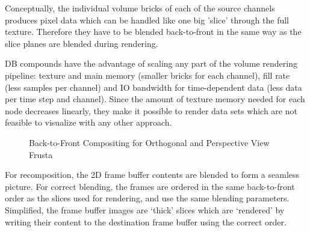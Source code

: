 \documentclass[10pt,a4]{scrartcl}
\begin{document}
Conceptually, the individual volume bricks of each of the source
channels produces pixel data which can be handled like one big 'slice'
through the full texture. Therefore they have to be blen\-ded
back-to-front in the same way as the slice planes are blended during
rendering.

DB compounds have the advantage of scaling any part of the volume
rendering pipeline: texture and main memory (smaller bricks for each
channel), fill rate (less samples per channel) and IO bandwidth for
time-dependent data (less data per time step and channel). Since the
amount of texture memory needed for each node decreases linearly, they
make it possible to render data sets which are not feasible to
visualize with any other approach.

\begin{figure}[h!t]
  \hfil
  {\caption{\small\label{fBlend}Back-to-Front Com\-po\-siting for
      Orthogonal and Perspective View Frusta}}
\end{figure}

For recomposition, the 2D frame buffer contents are blended to form a
seamless picture. For correct blending, the frames are ordered in the
same back-to-front order as the slices used for rendering, and use the
same blending parameters. Simplified, the frame buffer images are
`thick' slices which are `rendered' by writing their content to the
destination frame buffer using the correct order.
\end{document}
